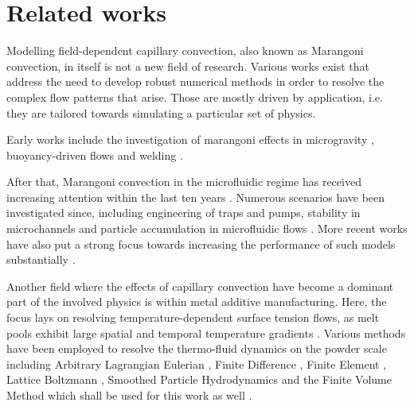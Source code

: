 \documentclass[conference,final,a4paper]{IEEEtran}
\begin{document}
\section{Related works}

Modelling field-dependent capillary convection, also known as Marangoni convection, in itself is not a new field of research.
Various works exist that address the need to develop robust numerical methods in order to resolve the complex flow patterns that arise. Those are mostly driven by application, i.e. they are tailored towards simulating a particular set of physics.

Early works include the investigation of marangoni effects in microgravity \cite{chunExperimentsTransitionSteady1979,chunMicrogravitySimulationMarangoni1978}, buoyancy-driven flows \cite{villersCoupledBuoyancyMarangoni1992} and welding \cite{limmaneevichitrExperimentsSimulateEffect2000,limmaneevichitrVisualizationMarangoniConvection2000}.

After that, Marangoni convection in the microfluidic regime has received increasing attention within the last ten years \cite{karbalaeiThermocapillarityMicrofluidicsReview2016}. Numerous scenarios have been investigated since, including engineering of traps and pumps, stability in microchannels and particle accumulation in microfluidic flows \cite{panInstabilityMarangoniToroidal2011,basuVirtualMicrofluidicTraps2008,orlishausenParticleAccumulationDepletion2017}. More recent works have also put a strong focus towards increasing the performance of such models substantially \cite{kronbichler2018fast}.

Another field where the effects of capillary convection have become a dominant part of the involved physics is within metal additive manufacturing. Here, the focus lays on resolving temperature-dependent surface tension flows, as melt pools exhibit large spatial and temporal temperature gradients \cite{debroyAdditiveManufacturingMetallic2018}. Various methods have been employed to resolve the thermo-fluid dynamics on the powder scale including Arbitrary Lagrangian Eulerian \cite{khairallahMesoscopicSimulationModel2014,martinDynamicsPoreFormation2019}, Finite Difference \cite{gusarovModelRadiationHeat2009}, Finite Element \cite{zhangMultiscaleMultiphysicsModeling2018,caoNovelHighefficientFinite2021,meier2021physics}, Lattice Boltzmann \cite{krzyzanowskiMultiphysicsSimulationApproach2021}, Smoothed Particle Hydrodynamics \cite{wimmerExperimentalNumericalInvestigations2021} and the Finite Volume Method which shall be used for this work as well \cite{leeMesoscopicSimulationHeat2015,gurtlerSimulationLaserBeam2013,ottoMultiphysicalSimulationLaser2012}.
\end{document}
